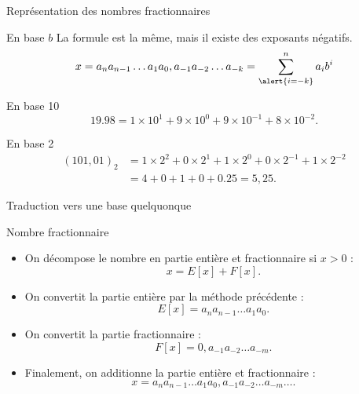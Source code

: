 \begin{frame}{Représentation des nombres fractionnaires}
  \begin{block}{En base $b$}
    La formule est la même, mais il existe des exposants négatifs.
    \[
      x = a_n a_{n-1} \ldots a_1 a_0,a_{-1}a_{-2}\ldots a_{-k} = \sum_{\alert{i=-k}}^n a_i b^i
    \]
  \end{block}
  
  \begin{exampleblock}{En base 10}
    \[
      19.98 = 1 \times 10^1 + 9 \times 10^0 + 9 \times 10^{-1} + 8 \times 10^{-2} .
    \]
  \end{exampleblock}
  \begin{exampleblock}{En base 2}
    \begin{align*}
      (101,01)_2 &= 1 \times 2^2 + 0 \times 2^1 + 1 \times 2^0 +  0 \times 2^{-1} + 1 \times 2^{-2} \\
      &= 4  + 0 + 1 + 0 + 0.25 = 5,25.
    \end{align*}
  \end{exampleblock}
  
\end{frame}

\begin{frame}{Traduction vers une base quelquonque}
    \begin{block}{Nombre fractionnaire}
        \begin{itemize}
        \item On décompose le nombre en partie entière et fractionnaire si $x > 0$ : 
          $$x = E[x] + F[x].$$
        \item On convertit la partie entière par la méthode précédente :
          $$E[x] =  a_n a_{n-1} \ldots a_1 a_0.$$ 
        \item On convertit la partie fractionnaire :
          $$F[x] = 0,a_{-1}a_{-2}\dots a_{-m}.$$
        \item Finalement, on additionne la partie entière et fractionnaire :
          $$x =  a_n a_{n-1} \ldots a_1 a_0,a_{-1}a_{-2}\dots a_{-m}\dots.$$
       \end{itemize}
  \end{block}

\end{frame}

